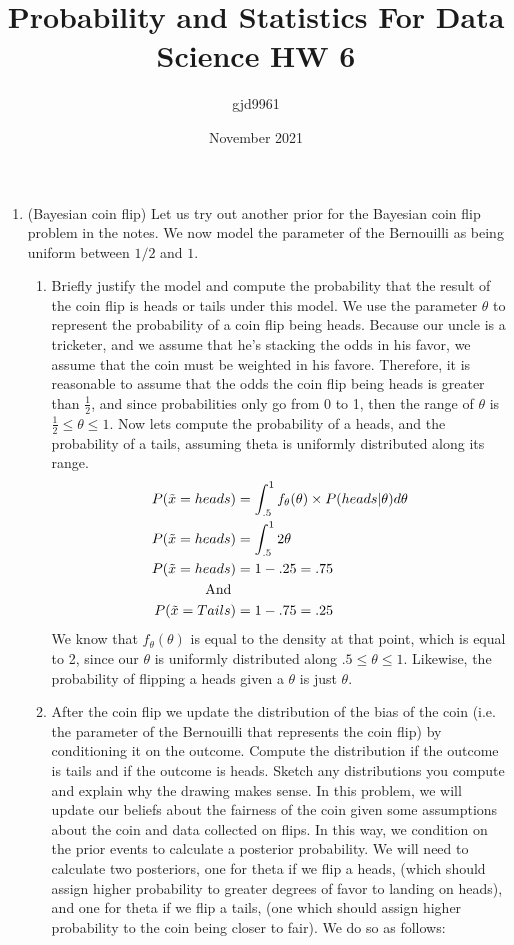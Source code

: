 \documentclass[12pt,twoside]{article}
\title{Probability and Statistics For Data Science HW 6}
\author{gjd9961}
\date{November 2021}
\newcommand{\rnd}{\Tilde}
\newcommand{\rX}{\rnd{ x}  }
\begin{document}
\maketitle
\begin{enumerate}

\item (Bayesian coin flip)
Let us try out another prior for the Bayesian coin flip problem in the notes. We now model the parameter of the Bernouilli as being uniform between $1/2$ and $1$.
\begin{enumerate}
\item Briefly justify the model and compute the probability that the result of the coin flip is heads or tails under this model. 
\subitem
We use the parameter $\theta$ to represent the probability of a coin flip being heads. Because our uncle is a tricketer, and we assume that he's stacking the odds in his favor, we assume that the coin must be weighted in his favore. Therefore, it is reasonable to assume that the odds the coin flip being heads is greater than $\frac{1}{2}$, and since probabilities only go from 0 to 1, then the range of $\theta$ is $\frac{1}{2} \leq \theta \leq 1$. Now lets compute the probability of a heads, and the probability of a tails, assuming theta is uniformly distributed along its range.
\begin{equation}
    \begin{split}
        P(\rX=heads) &= \int_{.5}^1 f_\theta(\theta) \times P(heads|\theta) d\theta \\
        P(\rX=heads) &= \int_{.5}^1 2\theta \\
        P(\rX=heads) &= 1-.25 = .75  \\
        \text{And } & \\
        P(\rX=Tails) &= 1 -.75 = .25
    \end{split}
\end{equation}
We know that $f_\theta(\theta)$ is equal to the density at that point, which is equal to 2, since our $\theta$ is uniformly distributed along $.5 \leq \theta \leq 1$. Likewise, the probability of flipping a heads given a $\theta$ is just $\theta$. 

\item After the coin flip we update the distribution of the bias of the coin (i.e. the parameter of the Bernouilli that represents the coin flip) by conditioning it on the outcome. Compute the distribution if the outcome is tails and if the outcome is heads. Sketch any distributions you compute and explain why the drawing makes sense.
\subitem 
In this problem, we will update our beliefs about the fairness of the coin given some assumptions about the coin and data collected on flips. In this way, we condition on the prior events to calculate a posterior probability. We will need to calculate two posteriors, one for theta if we flip a heads, (which should assign higher probability to greater degrees of favor to landing on heads), and one for theta if we flip a tails, (one which should assign higher probability to the coin being closer to fair). We do so as follows:


\end{enumerate}
\end{enumerate}
\end{document}
